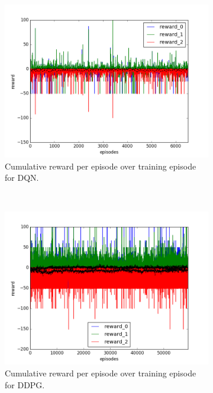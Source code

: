 \begin{figure}[h]
  \begin{subfigure}[h]{\figscale\linewidth}
    \includegraphics[trim=10 10 10 10,clip,width=\linewidth]
    {../results/dqn_1vs2/reward.png}
    \caption{Cumulative reward per episode over training episode for DQN.}
    \label{fig:dqn-1vs2-reward}
  \end{subfigure}
  ~
  \begin{subfigure}[h]{\figscale\linewidth}
    \includegraphics[trim=10 10 10 10,clip,width=\linewidth]
    {../results/ddpg_1vs2/reward.png}
    \caption{Cumulative reward per episode over training episode for DDPG.}
    \label{fig:ddpg-1vs2-reward}
  \end{subfigure}
  ~
  \begin{subfigure}[h]{\figscale\linewidth}

\end{subfigure}
\end{figure}
